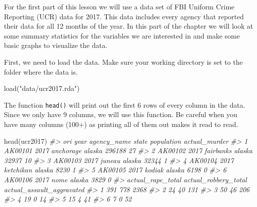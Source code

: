 \documentclass[
]{krantz}
\makeatletter
\newenvironment{Shaded}{\begin{snugshade}}{\end{snugshade}}
\newcommand{\CommentTok}[1]{\textcolor[rgb]{0.37,0.37,0.37}{\textit{#1}}}
\newcommand{\FunctionTok}[1]{\textcolor[rgb]{0,0,0}{#1}}
\newcommand{\NormalTok}[1]{#1}
\newcommand{\StringTok}[1]{\textcolor[rgb]{0.5,0.5,0.5}{#1}}
\newenvironment{kframe}{%
\medskip{}
\setlength{\fboxsep}{.8em}
 \def\at@end@of@kframe{}%
 \ifinner\ifhmode%
  \def\at@end@of@kframe{\end{minipage}}%
  \begin{minipage}{\columnwidth}%
 \fi\fi%
 \def\FrameCommand##1{\hskip\@totalleftmargin \hskip-\fboxsep
 \colorbox{shadecolor}{##1}\hskip-\fboxsep
     \hskip-\linewidth \hskip-\@totalleftmargin \hskip\columnwidth}%
 \MakeFramed {\advance\hsize-\width
   \@totalleftmargin\z@ \linewidth\hsize
   \@setminipage}}%
 {\par\unskip\endMakeFramed%
 \at@end@of@kframe}
\renewenvironment{Shaded}{\begin{kframe}}{\end{kframe}}
\makeatother
\begin{document}
For the first part of this lesson we will use a data set of FBI Uniform Crime Reporting (UCR) data for 2017. This data includes every agency that reported their data for all 12 months of the year. In this part of the chapter we will look at some summary statistics for the variables we are interested in and make some basic graphs to visualize the data.

First, we need to load the data. Make sure your working directory is set to the folder where the data is.

\begin{Shaded}
\begin{Highlighting}[]
\FunctionTok{load}\NormalTok{(}\StringTok{"data/ucr2017.rda"}\NormalTok{)}
\end{Highlighting}
\end{Shaded}

The function \texttt{head()} will print out the first 6 rows of every column in the data. Since we only have 9 columns, we will use this function. Be careful when you have many columns (100+) as printing all of them out makes it read to read.

\begin{Shaded}
\begin{Highlighting}[]
\FunctionTok{head}\NormalTok{(ucr2017)}
\CommentTok{\#\textgreater{}       ori year agency\_name  state population actual\_murder}
\CommentTok{\#\textgreater{} 1 AK00101 2017   anchorage alaska     296188            27}
\CommentTok{\#\textgreater{} 2 AK00102 2017   fairbanks alaska      32937            10}
\CommentTok{\#\textgreater{} 3 AK00103 2017      juneau alaska      32344             1}
\CommentTok{\#\textgreater{} 4 AK00104 2017   ketchikan alaska       8230             1}
\CommentTok{\#\textgreater{} 5 AK00105 2017      kodiak alaska       6198             0}
\CommentTok{\#\textgreater{} 6 AK00106 2017        nome alaska       3829             0}
\CommentTok{\#\textgreater{}   actual\_rape\_total actual\_robbery\_total actual\_assault\_aggravated}
\CommentTok{\#\textgreater{} 1               391                  778                      2368}
\CommentTok{\#\textgreater{} 2                24                   40                       131}
\CommentTok{\#\textgreater{} 3                50                   46                       206}
\CommentTok{\#\textgreater{} 4                19                    0                        14}
\CommentTok{\#\textgreater{} 5                15                    4                        41}
\CommentTok{\#\textgreater{} 6                 7                    0                        52}
\end{Highlighting}
\end{Shaded}
\end{document}

